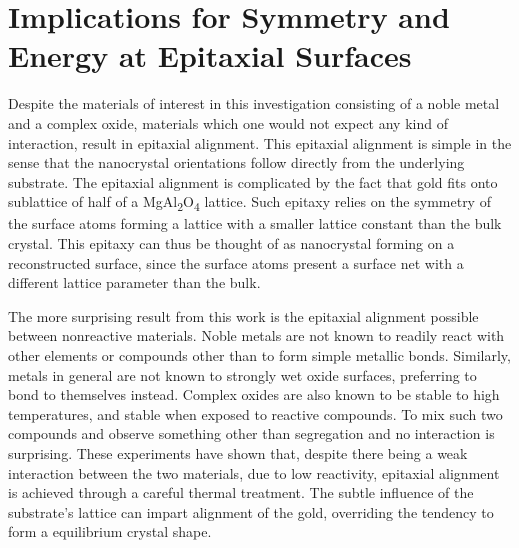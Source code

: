 \section{Implications for Symmetry and Energy at Epitaxial Surfaces}
Despite the materials of interest in this investigation consisting of a noble metal and a complex oxide, materials which one would not expect any kind of interaction, result in epitaxial alignment.
This epitaxial alignment is simple in the sense that the nanocrystal orientations follow directly from the underlying substrate.
The epitaxial alignment is complicated by the fact that gold fits onto sublattice of half of a MgAl\textsubscript{2}O\textsubscript{4} lattice.
Such epitaxy relies on the symmetry of the surface atoms forming a lattice with a smaller lattice constant than the bulk crystal.
This epitaxy can thus be thought of as nanocrystal forming on a reconstructed surface, since the surface atoms present a surface net with a different lattice parameter than the bulk.

The more surprising result from this work is the epitaxial alignment possible between nonreactive materials.
Noble metals are not known to readily react with other elements or compounds other than to form simple metallic bonds.
Similarly, metals in general are not known to strongly wet oxide surfaces, preferring to bond to themselves instead.
Complex oxides are also known to be stable to high temperatures, and stable when exposed to reactive compounds.
To mix such two compounds and observe something other than segregation and no interaction is surprising.
These experiments have shown that, despite there being a weak interaction between the two materials, due to low reactivity, epitaxial alignment is achieved through a careful thermal treatment.
The subtle influence of the substrate's lattice can impart alignment of the gold, overriding the tendency to form a equilibrium crystal shape.
